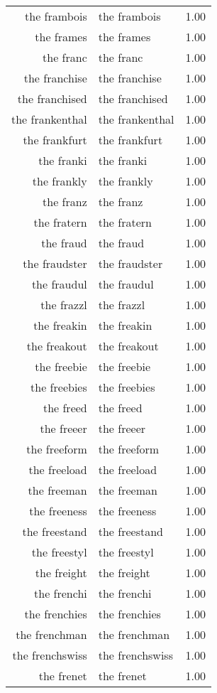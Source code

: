 \begin{table}[ht]
\begin{tabular}{rlr}
  the frambois & the frambois & 1.00 \\ 
  the frames & the frames & 1.00 \\ 
  the franc & the franc & 1.00 \\ 
  the franchise & the franchise & 1.00 \\ 
  the franchised & the franchised & 1.00 \\ 
  the frankenthal & the frankenthal & 1.00 \\ 
  the frankfurt & the frankfurt & 1.00 \\ 
  the franki & the franki & 1.00 \\ 
  the frankly & the frankly & 1.00 \\ 
  the franz & the franz & 1.00 \\ 
  the fratern & the fratern & 1.00 \\ 
  the fraud & the fraud & 1.00 \\ 
  the fraudster & the fraudster & 1.00 \\ 
  the fraudul & the fraudul & 1.00 \\ 
  the frazzl & the frazzl & 1.00 \\ 
  the freakin & the freakin & 1.00 \\ 
  the freakout & the freakout & 1.00 \\ 
  the freebie & the freebie & 1.00 \\ 
  the freebies & the freebies & 1.00 \\ 
  the freed & the freed & 1.00 \\ 
  the freeer & the freeer & 1.00 \\ 
  the freeform & the freeform & 1.00 \\ 
  the freeload & the freeload & 1.00 \\ 
  the freeman & the freeman & 1.00 \\ 
  the freeness & the freeness & 1.00 \\ 
  the freestand & the freestand & 1.00 \\ 
  the freestyl & the freestyl & 1.00 \\ 
  the freight & the freight & 1.00 \\ 
  the frenchi & the frenchi & 1.00 \\ 
  the frenchies & the frenchies & 1.00 \\ 
  the frenchman & the frenchman & 1.00 \\ 
  the frenchswiss & the frenchswiss & 1.00 \\ 
  the frenet & the frenet & 1.00 \\ 

\end{tabular}
\end{table}
